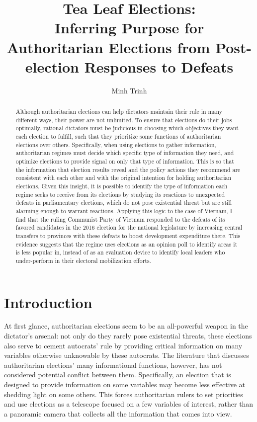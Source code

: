 \documentclass[12pt]{article}
\title{Tea Leaf Elections: \\
	Inferring Purpose for Authoritarian Elections from Post-election Responses to Defeats}
\author{Minh Trinh}
\newcommand{\1}{\mathbbm{1}}
\begin{document}
\maketitle

\begin{abstract}
Although authoritarian elections can help dictators maintain their rule in many different ways, their power are not unlimited. To ensure that elections do their jobs optimally, rational dictators must be judicious in choosing which objectives they want each election to fulfill, such that they prioritize some functions of authoritarian elections over others. Specifically, when using elections to gather information, authoritarian regimes must decide which specific type of information they need, and optimize elections to provide signal on only that type of information. This is so that the information that election results reveal and the policy actions they recommend are consistent with each other and with the original intention for holding authoritarian elections. Given this insight, it is possible to identify the type of information each regime seeks to receive from its elections by studying its reactions to unexpected defeats in parliamentary elections, which do not pose existential threat but are still alarming enough to warrant reactions. Applying this logic to the case of Vietnam, I find that the ruling Communist Party of Vietnam responded to the defeats of its favored candidates in the 2016 election for the national legislature by increasing central transfers to provinces with these defeats to boost development expenditure there. This evidence suggests that the regime uses elections as an opinion poll to identify areas it is less popular in, instead of as an evaluation device to identify local leaders who under-perform in their electoral mobilization efforts.
\end{abstract}

\newpage
\doublespacing

\section{Introduction}

At first glance, authoritarian elections seem to be an all-powerful weapon in the dictator's arsenal: not only do they rarely pose existential threats, these elections also serve to cement autocrats' rule by providing critical information on many variables otherwise unknowable by these autocrats. The literature that discusses authoritarian elections' many informational functions, however, has not considered potential conflict between them. Specifically, an election that is designed to provide information on some variables may become less effective at shedding light on some others. This forces authoritarian rulers to set priorities and use elections as a telescope focused on a few variables of interest, rather than a panoramic camera that collects all the information that comes into view.
\end{document}
